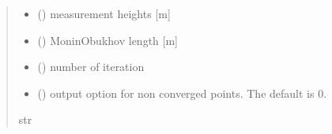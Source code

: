 \documentclass[letterpaper,10pt,english]{sphinxmanual}
\begin{document}
\begin{fulllineitems}
\begin{quote}
\begin{description}
\begin{itemize}
\item {}
\sphinxAtStartPar
{} () \textendash{} measurement heights           {[}m{]}

\item {}
\sphinxAtStartPar
{} () \textendash{} Monin\sphinxhyphen{}Obukhov length          {[}m{]}

\item {}
\sphinxAtStartPar
{} () \textendash{} number of iteration

\item {}
\sphinxAtStartPar
{} (\sphinxstyleliteralemphasis{\sphinxupquote{, }}) \textendash{} output option for non converged points. The default is 0.

\end{itemize}

\sphinxAtStartPar
{}

\sphinxAtStartPar
str

\end{description}\end{quote}

\end{fulllineitems}

\end{document}
